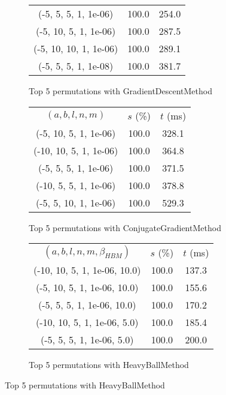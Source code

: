 \begin{figure}[H]
\begin{subfigure}[ht]{.5\textwidth}
\begin{tabular}{|c|c|c|}
(-5, 5, 5, 1, 1e-06) & 100.0 & 254.0 \\
(-5, 10, 5, 1, 1e-06) & 100.0 & 287.5 \\
(-5, 10, 10, 1, 1e-06) & 100.0 & 289.1 \\
(-5, 5, 5, 1, 1e-08) & 100.0 & 381.7 \\
\hline
\end{tabular}
\caption{Top 5 permutations with GradientDescentMethod}
\label{subfig:param_comp_MatrixSquareSum_GradientDescentMethod_UniformSearch}
\end{subfigure}
\hfill
\begin{subfigure}[ht]{.5\textwidth}
\begin{tabular}{|c|c|c|}
\hline
\rowcolor{gray!25}
\multicolumn{3}{|c|}{ConjugateGradientMethod} \\
\hline
\rowcolor{gray!25}
$(a,b,l,n,m)$ & $s$ (\%) & $t$ (ms) \\
\hline
(-5, 10, 5, 1, 1e-06) & 100.0 & 328.1 \\
(-10, 10, 5, 1, 1e-06) & 100.0 & 364.8 \\
(-5, 5, 5, 1, 1e-06) & 100.0 & 371.5 \\
(-10, 5, 5, 1, 1e-06) & 100.0 & 378.8 \\
(-5, 5, 10, 1, 1e-06) & 100.0 & 529.3 \\
\hline
\end{tabular}
\caption{Top 5 permutations with ConjugateGradientMethod}
\label{subfig:param_comp_MatrixSquareSum_ConjugateGradientMethod_UniformSearch}
\end{subfigure}
\hfill
\begin{subfigure}[ht]{.5\textwidth}
\begin{tabular}{|c|c|c|}
\hline
\rowcolor{gray!25}
\multicolumn{3}{|c|}{HeavyBallMethod} \\
\hline
\rowcolor{gray!25}
$(a,b,l,n,m,\beta_{HBM})$ & $s$ (\%) & $t$ (ms) \\
\hline
(-10, 10, 5, 1, 1e-06, 10.0) & 100.0 & 137.3 \\
(-5, 10, 5, 1, 1e-06, 10.0) & 100.0 & 155.6 \\
(-5, 5, 5, 1, 1e-06, 10.0) & 100.0 & 170.2 \\
(-10, 10, 5, 1, 1e-06, 5.0) & 100.0 & 185.4 \\
(-5, 5, 5, 1, 1e-06, 5.0) & 100.0 & 200.0 \\
\hline
\end{tabular}
\caption{Top 5 permutations with HeavyBallMethod}
\label{subfig:param_comp_MatrixSquareSum_HeavyBallMethod_UniformSearch}
\end{subfigure}
\end{figure}

